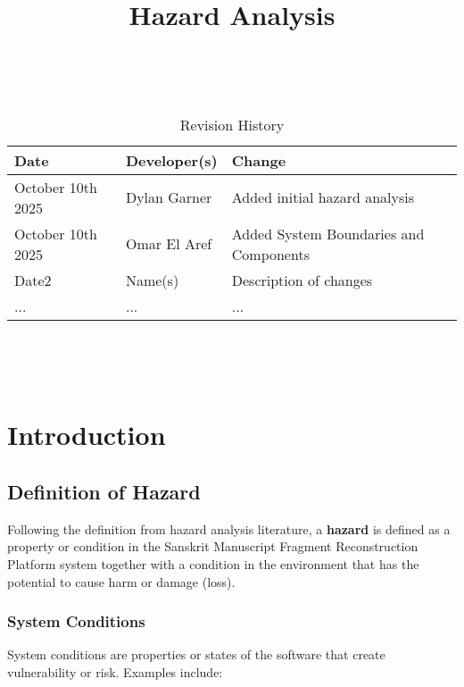 \documentclass{article}
\title{Hazard Analysis\\\progname}
\author{\authname}
\date{}
\begin{document}
\maketitle
\thispagestyle{empty}

~\newpage


\begin{table}[hp]
\caption{Revision History} \label{TblRevisionHistory}
\begin{tabularx}{\textwidth}{llX}
\toprule
\textbf{Date} & \textbf{Developer(s)} & \textbf{Change}\\
\midrule
October 10th 2025 & Dylan Garner & Added initial hazard analysis\\
October 10th 2025 & Omar El Aref & Added System Boundaries and Components\\
Date2 & Name(s) & Description of changes\\
... & ... & ...\\
\bottomrule
\end{tabularx}
\end{table}

~\newpage

\tableofcontents

~\newpage



\section{Introduction}

\subsection{Definition of Hazard}

Following the definition from hazard analysis literature, a \textbf{hazard} is defined as a property or condition in the Sanskrit Manuscript Fragment Reconstruction Platform system together with a condition in the environment that has the potential to cause harm or damage (loss).

\subsubsection{System Conditions}

System conditions are properties or states of the software that create vulnerability or risk. Examples include:
\end{document}
